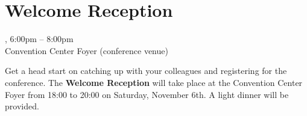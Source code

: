 \clearpage
\section[Welcome Reception]{Welcome Reception}

\begin{center}


\daydateyear, 6:00pm -- 8:00pm \vspace{1em}\\
Convention Center Foyer (conference venue)\\
\end{center}

\noindent Get a head start on catching up with your colleagues and registering for the conference.
The \textbf{Welcome Reception} will take place at the Convention Center Foyer from 18:00 to 20:00 on Saturday, November 6th.
A light dinner will be provided.
